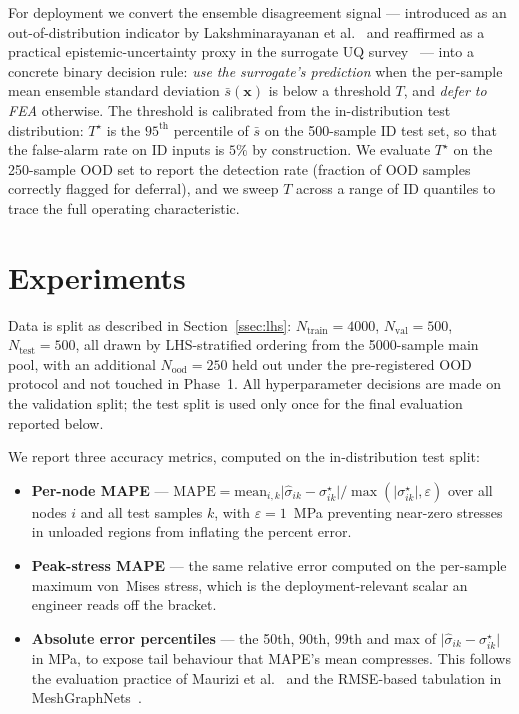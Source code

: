 \documentclass[11pt]{article}
\begin{document}
For deployment we convert the ensemble disagreement signal --- introduced
as an out-of-distribution indicator by Lakshminarayanan et
al.~\cite{lakshminarayanan2017ensembles} and reaffirmed as a practical
epistemic-uncertainty proxy in the surrogate UQ
survey~\cite{psaros2023uq} --- into a concrete
binary decision rule: \emph{use the surrogate's prediction} when the
per-sample mean ensemble standard deviation $\bar{s}(\mathbf{x})$ is below
a threshold $T$, and \emph{defer to FEA} otherwise. The threshold is
calibrated from the in-distribution test distribution: $T^\star$ is the
$95^{\mathrm{th}}$ percentile of $\bar{s}$ on the 500-sample ID test set,
so that the false-alarm rate on ID inputs is $5\%$ by construction. We
evaluate $T^\star$ on the 250-sample OOD set to report the detection rate
(fraction of OOD samples correctly flagged for deferral), and we sweep $T$
across a range of ID quantiles to trace the full operating characteristic.

\section{Experiments}
\label{sec:experiments}

Data is split as described in Section~\ref{ssec:lhs}: $N_{\mathrm{train}}
= 4000$, $N_{\mathrm{val}} = 500$, $N_{\mathrm{test}} = 500$, all drawn by
LHS-stratified ordering from the 5000-sample main pool, with an additional
$N_{\mathrm{ood}} = 250$ held out under the pre-registered OOD protocol
and not touched in Phase~1. All hyperparameter decisions are made on the
validation split; the test split is used only once for the final
evaluation reported below.

We report three accuracy metrics, computed on the in-distribution test
split:

\begin{itemize}
  \item \textbf{Per-node MAPE} ---
    $\mathrm{MAPE} = \mathrm{mean}_{i,k}
    \lvert \hat{\sigma}_{ik} - \sigma^\star_{ik} \rvert /
    \max(\lvert \sigma^\star_{ik} \rvert, \varepsilon)$
    over all nodes $i$ and all test samples $k$, with
    $\varepsilon = 1$~MPa preventing near-zero stresses in unloaded
    regions from inflating the percent error.
  \item \textbf{Peak-stress MAPE} --- the same relative error computed on
    the per-sample maximum von~Mises stress, which is the
    deployment-relevant scalar an engineer reads off the bracket.
  \item \textbf{Absolute error percentiles} --- the 50th, 90th, 99th
    and max of $\lvert \hat{\sigma}_{ik} - \sigma^\star_{ik} \rvert$ in
    MPa, to expose tail behaviour that MAPE's mean compresses. This
    follows the evaluation practice of Maurizi et
    al.~\cite{maurizi2022gnn} and the RMSE-based tabulation in
    MeshGraphNets~\cite{pfaff2021meshgraphnets}.
\end{itemize}
\end{document}
